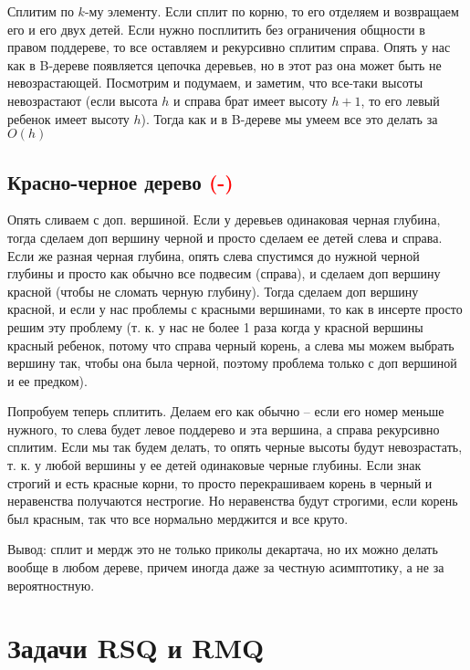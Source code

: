 Сплитим по $k$-му элементу. Если сплит по корню, то его отделяем и возвращаем его и его двух детей. Если нужно посплитить без ограничения общности в правом поддереве, то все оставляем и рекурсивно сплитим справа. %
Опять у нас как в B-дереве появляется цепочка деревьев, но в этот раз она может быть не невозрастающей. Посмотрим и подумаем, и заметим, что все-таки высоты невозрастают (если высота $h$ и справа брат имеет высоту $h+1$, то его левый ребенок имеет высоту $h$). Тогда как и в B-дереве мы умеем все это делать за $O(h)$


\subsection{Красно-черное дерево \textcolor{red}{(-)}}


Опять сливаем с доп. вершиной. Если у деревьев одинаковая черная глубина, тогда сделаем доп вершину черной и просто сделаем ее детей слева и справа. Если же разная черная глубина, опять слева спустимся до нужной черной глубины и просто как обычно все подвесим (справа), и сделаем доп вершину красной (чтобы не сломать черную глубину). Тогда сделаем доп вершину красной, и если у нас проблемы с красными вершинами, то как в инсерте просто решим эту проблему (т. к. у нас не более 1 раза когда у красной вершины красный ребенок, потому что справа черный корень, а слева мы можем выбрать вершину так, чтобы она была черной, поэтому проблема только с доп вершиной и ее предком).

Попробуем теперь сплитить. Делаем его как обычно -- если его номер меньше нужного, то слева будет левое поддерево и эта вершина, а справа рекурсивно сплитим. Если мы так будем делать, то опять черные высоты будут невозрастать, т. к. у любой вершины у ее детей одинаковые черные глубины. 
Если знак строгий и есть красные корни, то просто перекрашиваем корень в черный и неравенства получаются нестрогие. Но неравенства будут строгими, если корень был красным, так что все нормально мерджится и все круто.


Вывод: сплит и мердж это не только приколы декартача, но их можно делать вообще в любом дереве, причем иногда даже за честную асимптотику, а не за вероятностную.




\section{Задачи RSQ и RMQ}




